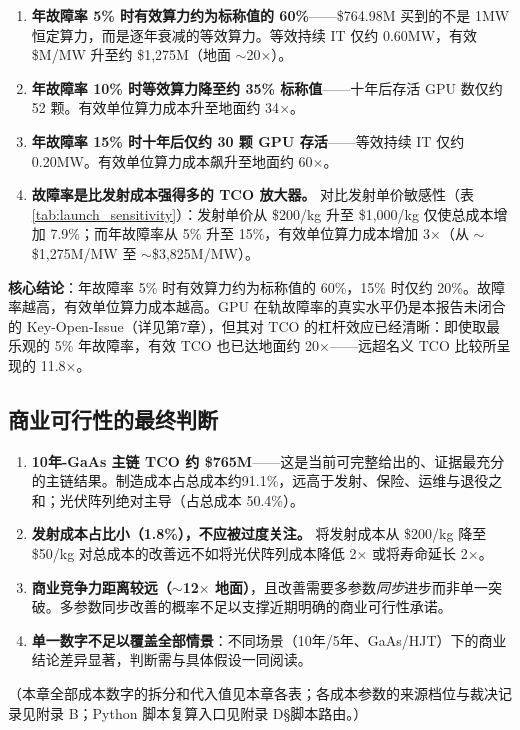 \begin{enumerate}[leftmargin=*]
    \item \textbf{年故障率 5\% 时有效算力约为标称值的 60\%}——\$764.98M 买到的不是 1\;MW 恒定算力，而是逐年衰减的等效算力。等效持续 IT 仅约 0.60\;MW，有效\$M/MW 升至约 \$1,275M（地面 $\sim$20$\times$）。
    \item \textbf{年故障率 10\% 时等效算力降至约 35\% 标称值}——十年后存活 GPU 数仅约 52 颗。有效单位算力成本升至地面约 34$\times$。
    \item \textbf{年故障率 15\% 时十年后仅约 30 颗 GPU 存活}——等效持续 IT 仅约 0.20\;MW。有效单位算力成本飙升至地面约 60$\times$。
    \item \textbf{故障率是比发射成本强得多的 TCO 放大器。} 对比发射单价敏感性（表\ref{tab:launch_sensitivity}）：发射单价从 \$200/kg 升至 \$1,000/kg 仅使总成本增加 7.9\%；而年故障率从 5\% 升至 15\%，有效单位算力成本增加 3$\times$（从 $\sim$\$1,275M/MW 至 $\sim$\$3,825M/MW）。
\end{enumerate}

\textbf{核心结论}：年故障率 5\% 时有效算力约为标称值的 60\%，15\% 时仅约 20\%。故障率越高，有效单位算力成本越高。GPU 在轨故障率的真实水平仍是本报告未闭合的 Key-Open-Issue（详见第7章），但其对 TCO 的杠杆效应已经清晰：即使取最乐观的 5\% 年故障率，有效 TCO 也已达地面约 20$\times$——远超名义 TCO 比较所呈现的 11.8$\times$。

\subsection{商业可行性的最终判断}

\begin{enumerate}[leftmargin=*]
    \item \textbf{10年-GaAs 主链 TCO 约 \$765M}——这是当前可完整给出的、证据最充分的主链结果。制造成本占总成本约91.1\%，远高于发射、保险、运维与退役之和；光伏阵列绝对主导（占总成本 50.4\%）。
    \item \textbf{发射成本占比小（1.8\%），不应被过度关注。} 将发射成本从 \$200/kg 降至 \$50/kg 对总成本的改善远不如将光伏阵列成本降低 2$\times$ 或将寿命延长 2$\times$。
    \item \textbf{商业竞争力距离较远（$\sim$12$\times$ 地面）}，且改善需要多参数\emph{同步}进步而非单一突破。多参数同步改善的概率不足以支撑近期明确的商业可行性承诺。
    \item \textbf{单一数字不足以覆盖全部情景}：不同场景（10年/5年、GaAs/HJT）下的商业结论差异显著，判断需与具体假设一同阅读。
\end{enumerate}

（本章全部成本数字的拆分和代入值见本章各表；各成本参数的来源档位与裁决记录见附录 B；Python 脚本复算入口见附录 D\;\S 脚本路由。）

\endinput
